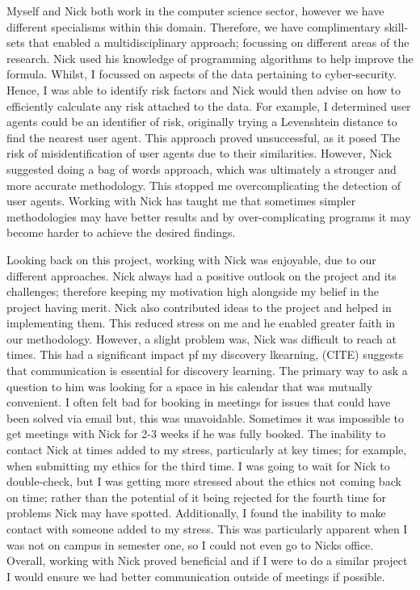  Myself and Nick both work in the computer science sector, however we have different specialisms within this domain. Therefore, we have complimentary skill-sets that enabled a multidisciplinary approach; focussing on different areas of the research. Nick used his knowledge of programming algorithms to help improve the formula. Whilst, I focussed on aspects of the data pertaining to cyber-security. Hence, I was able to identify risk factors and Nick would then advise on how to efficiently calculate any risk attached to the data. For example, I determined user agents could be an identifier of risk,  originally trying a Levenshtein distance to find the nearest user agent. This approach proved unsuccessful, as it posed The risk of misidentification of user agents due to their similarities. However, Nick suggested doing a bag of words approach, which was ultimately a stronger and more accurate methodology. This stopped me overcomplicating the detection of user agents. Working with Nick has taught me that sometimes simpler methodologies may have better results and by over-complicating programs it may become harder to achieve the desired findings.


Looking back on this project, working with Nick was enjoyable, due to our different approaches. Nick always had a positive outlook on the project and its challenges; therefore keeping my motivation high alongside my belief in the project having merit. Nick also contributed ideas to the project and helped in implementing them. This reduced stress on me and he enabled greater faith in our methodology. However, a slight problem was, Nick was difficult to reach at times. This had a significant impact pf my discovery lkearning, (CITE) suggests that communication is essential for discovery learning. The primary way to ask a question to him was looking for a space in his calendar that was mutually convenient. I often felt bad for booking in meetings for issues that could have been solved via email but, this was unavoidable. Sometimes it was impossible to get meetings with Nick for 2-3 weeks if he was fully booked. The inability to contact Nick at times added to my stress, particularly at key times; for example, when submitting my ethics for the third time. I was going to wait for Nick to double-check, but I was getting more stressed about the ethics not coming back on time; rather than the potential of it being rejected for the fourth time for problems Nick may have spotted. Additionally, I found the inability to make contact with someone added to my stress. This was particularly apparent when I was not on campus in semester one, so I could not even go to Nicks office. Overall, working with Nick proved beneficial and if I were to do a similar project I would ensure we had better communication outside of meetings if possible.

